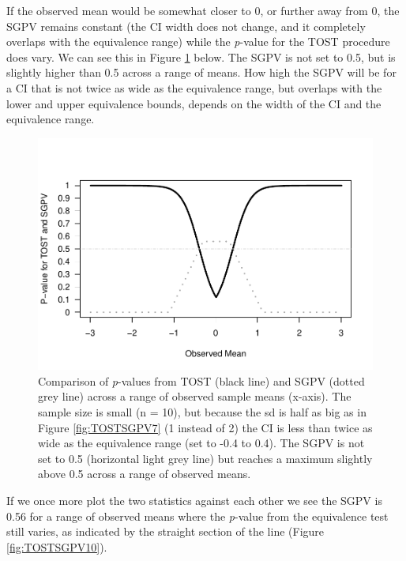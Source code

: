 \documentclass[,man,floatsintext]{apa6}
\begin{document}
If the observed mean would be somewhat closer to 0, or further away from
0, the SGPV remains constant (the CI width does not change, and it
completely overlaps with the equivalence range) while the \emph{p}-value
for the TOST procedure does vary. We can see this in Figure
\ref{fig:TOSTSGPV9} below. The SGPV is not set to 0.5, but is slightly
higher than 0.5 across a range of means. How high the SGPV will be for a
CI that is not twice as wide as the equivalence range, but overlaps with
the lower and upper equivalence bounds, depends on the width of the CI
and the equivalence range.

\begin{figure}
\centering
\includegraphics{manuscript.R1_files/figure-latex/TOSTSGPV9-1.pdf}
\caption{\label{fig:TOSTSGPV9}Comparison of \emph{p}-values from TOST (black
line) and SGPV (dotted grey line) across a range of observed sample
means (x-axis). The sample size is small (n = 10), but because the sd is
half as big as in Figure \ref{fig:TOSTSGPV7} (1 instead of 2) the CI is
less than twice as wide as the equivalence range (set to -0.4 to 0.4).
The SGPV is not set to 0.5 (horizontal light grey line) but reaches a
maximum slightly above 0.5 across a range of observed means.}
\end{figure}

If we once more plot the two statistics against each other we see the
SGPV is 0.56 for a range of observed means where the \emph{p}-value from
the equivalence test still varies, as indicated by the straight section
of the line (Figure \ref{fig:TOSTSGPV10}).
\end{document}
